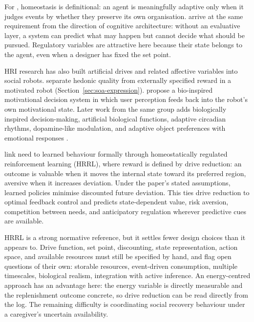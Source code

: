 For \citet{DiPaolo2003OrganismicallyInspired}, homeostasis is definitional: an agent is meaningfully adaptive only when it judges events by whether they preserve its own organisation. \citet{Pasquali2026ISEED} arrive at the same requirement from the direction of cognitive architecture: without an evaluative layer, a system can predict what may happen but cannot decide what should be pursued. Regulatory variables are attractive here because their state belongs to the agent, even when a designer has fixed the set point.

HRI research has also built artificial drives and related affective variables into social robots. \citet{LewisCanamero2016Hedonic} separate hedonic quality from externally specified reward in a motivated robot (Section~\ref{sec:soa-expression}). \citet{MarotoGomez2018MotivationalDecision} propose a bio-inspired motivational decision system in which user perception feeds back into the robot's own motivational state. Later work from the same group adds biologically inspired decision-making, artificial biological functions, adaptive circadian rhythms, dopamine-like modulation, and adaptive object preferences with emotional responses \citep{MarotoGomez2023BiologicalDecision,MarotoGomez2023ArtificialBiologicalFunctions,MarotoGomez2023Circadian,MarotoGomez2024Dopamine,MarotoGomez2025RobotCompanion}.

\citet{Yoshida2025HomeostasisRL} link need to learned behaviour formally through homeostatically regulated reinforcement learning (HRRL), where reward is defined by drive reduction: an outcome is valuable when it moves the internal state toward its preferred region, aversive when it increases deviation. Under the paper's stated assumptions, learned policies minimise discounted future deviation. This ties drive reduction to optimal feedback control and predicts state-dependent value, risk aversion, competition between needs, and anticipatory regulation wherever predictive cues are available.

HRRL is a strong normative reference, but it settles fewer design choices than it appears to. Drive function, set point, discounting, state representation, action space, and available resources must still be specified by hand, and \citet{Yoshida2025HomeostasisRL} flag open questions of their own: storable resources, event-driven consumption, multiple timescales, biological realism, integration with active inference. An energy-centred approach has an advantage here: the energy variable is directly measurable and the replenishment outcome concrete, so drive reduction can be read directly from the log. The remaining difficulty is coordinating social recovery behaviour under a caregiver's uncertain availability.

